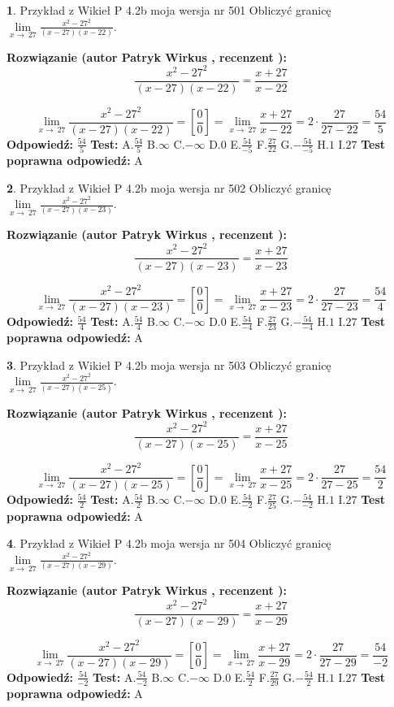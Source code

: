 \documentclass[12pt, a4paper]{article}
\theoremstyle{definition} %
\newtheorem{zad}{}
\newcommand{\zadStart}[1]{\begin{zad}#1\newline}
\newcommand{\zadStop}{\end{zad}}
\newcommand{\rozwStart}[2]{\noindent \textbf{Rozwiązanie (autor #1 , recenzent #2): }\newline}
\newcommand{\rozwStop}{\newline}
\newcommand{\odpStart}{\noindent \textbf{Odpowiedź:}\newline}
\newcommand{\odpStop}{\newline}
\newcommand{\testStart}{\noindent \textbf{Test:}\newline}
\newcommand{\testStop}{\newline}
\newcommand{\kluczStart}{\noindent \textbf{Test poprawna odpowiedź:}\newline}
\newcommand{\kluczStop}{\newline}
\begin{document}
\zadStart{Przykład z Wikieł P 4.2b moja wersja nr 501}
Obliczyć granicę $\lim\limits_{x\to\ 27}\frac{x^{2}-27^{2}}{(x-27)(x-22)}$.
\zadStop
\rozwStart{Patryk Wirkus}{}
$$\frac{x^{2}-27^{2}}{(x-27)(x-22)}=\frac{x+27}{x-22}$$

$$\lim\limits_{x\to\ 27}\frac{x^{2}-27^{2}}{(x-27)(x-22)}=[\frac{0}{0}]=\lim\limits_{x\to\ 27}\frac{x+27}{x-22}=2 \cdot \frac{27}{27-22} = \frac{54}{5}$$
\rozwStop
\odpStart
$\frac{54}{5}$
\odpStop
\testStart
A.$\frac{54}{5}$
B.$\infty$
C.$-\infty$
D.$0$
E.$\frac{54}{-5}$
F.$\frac{27}{22}$
G.$-\frac{54}{-5}$
H.$1$
I.$27$
\testStop
\kluczStart
A
\kluczStop



\zadStart{Przykład z Wikieł P 4.2b moja wersja nr 502}
Obliczyć granicę $\lim\limits_{x\to\ 27}\frac{x^{2}-27^{2}}{(x-27)(x-23)}$.
\zadStop
\rozwStart{Patryk Wirkus}{}
$$\frac{x^{2}-27^{2}}{(x-27)(x-23)}=\frac{x+27}{x-23}$$

$$\lim\limits_{x\to\ 27}\frac{x^{2}-27^{2}}{(x-27)(x-23)}=[\frac{0}{0}]=\lim\limits_{x\to\ 27}\frac{x+27}{x-23}=2 \cdot \frac{27}{27-23} = \frac{54}{4}$$
\rozwStop
\odpStart
$\frac{54}{4}$
\odpStop
\testStart
A.$\frac{54}{4}$
B.$\infty$
C.$-\infty$
D.$0$
E.$\frac{54}{-4}$
F.$\frac{27}{23}$
G.$-\frac{54}{-4}$
H.$1$
I.$27$
\testStop
\kluczStart
A
\kluczStop



\zadStart{Przykład z Wikieł P 4.2b moja wersja nr 503}
Obliczyć granicę $\lim\limits_{x\to\ 27}\frac{x^{2}-27^{2}}{(x-27)(x-25)}$.
\zadStop
\rozwStart{Patryk Wirkus}{}
$$\frac{x^{2}-27^{2}}{(x-27)(x-25)}=\frac{x+27}{x-25}$$

$$\lim\limits_{x\to\ 27}\frac{x^{2}-27^{2}}{(x-27)(x-25)}=[\frac{0}{0}]=\lim\limits_{x\to\ 27}\frac{x+27}{x-25}=2 \cdot \frac{27}{27-25} = \frac{54}{2}$$
\rozwStop
\odpStart
$\frac{54}{2}$
\odpStop
\testStart
A.$\frac{54}{2}$
B.$\infty$
C.$-\infty$
D.$0$
E.$\frac{54}{-2}$
F.$\frac{27}{25}$
G.$-\frac{54}{-2}$
H.$1$
I.$27$
\testStop
\kluczStart
A
\kluczStop



\zadStart{Przykład z Wikieł P 4.2b moja wersja nr 504}
Obliczyć granicę $\lim\limits_{x\to\ 27}\frac{x^{2}-27^{2}}{(x-27)(x-29)}$.
\zadStop
\rozwStart{Patryk Wirkus}{}
$$\frac{x^{2}-27^{2}}{(x-27)(x-29)}=\frac{x+27}{x-29}$$

$$\lim\limits_{x\to\ 27}\frac{x^{2}-27^{2}}{(x-27)(x-29)}=[\frac{0}{0}]=\lim\limits_{x\to\ 27}\frac{x+27}{x-29}=2 \cdot \frac{27}{27-29} = \frac{54}{-2}$$
\rozwStop
\odpStart
$\frac{54}{-2}$
\odpStop
\testStart
A.$\frac{54}{-2}$
B.$\infty$
C.$-\infty$
D.$0$
E.$\frac{54}{2}$
F.$\frac{27}{29}$
G.$-\frac{54}{2}$
H.$1$
I.$27$
\testStop
\kluczStart
A
\kluczStop
\end{document}
